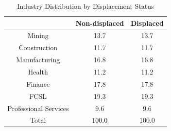 \documentclass{article}
\begin{document}
\begin{table}[htbp] 
\centering 
\begin{threeparttable} 
\caption{Industry Distribution by Displacement Status} 

\centering
\begin{tabular}{lll}
\toprule
\multicolumn{1}{c}{} &
  \multicolumn{1}{c}{Non-displaced} &
  \multicolumn{1}{c}{Displaced} \\
\midrule
\multicolumn{1}{c}{Mining} &
  \multicolumn{1}{c}{13.7} &
  \multicolumn{1}{c}{13.7} \\
\multicolumn{1}{c}{Construction} &
  \multicolumn{1}{c}{11.7} &
  \multicolumn{1}{c}{11.7} \\
\multicolumn{1}{c}{Manufacturing} &
  \multicolumn{1}{c}{16.8} &
  \multicolumn{1}{c}{16.8} \\
\multicolumn{1}{c}{Health} &
  \multicolumn{1}{c}{11.2} &
  \multicolumn{1}{c}{11.2} \\
\multicolumn{1}{c}{Finance} &
  \multicolumn{1}{c}{17.8} &
  \multicolumn{1}{c}{17.8} \\
\multicolumn{1}{c}{FCSL} &
  \multicolumn{1}{c}{19.3} &
  \multicolumn{1}{c}{19.3} \\
\multicolumn{1}{c}{Professional Services} &
  \multicolumn{1}{c}{9.6} &
  \multicolumn{1}{c}{9.6} \\
\multicolumn{1}{c}{Total} &
  \multicolumn{1}{c}{100.0} &
  \multicolumn{1}{c}{100.0} \\
\bottomrule
\end{tabular}

\end{threeparttable} 
\end{table}
\end{document}
